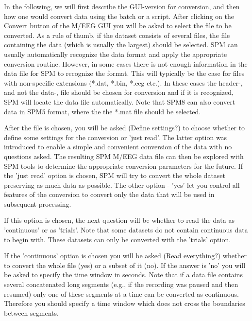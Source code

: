 In the following, we will first describe the GUI-version for
conversion, and then how one would convert data using the batch or a
script. After clicking on the Convert button of the M/EEG GUI you will
be asked to select the file to be converted. As a rule of thumb, if the
dataset consists of several files, the file containing the data (which
is usually the largest) should be selected. SPM can usually
automatically recognize the data format and apply the appropriate
conversion routine. However, in some cases there is not enough
information in the data file for SPM to recognize the format. This
will typically be the case for files with non-specific extensions
(*.dat, *.bin, *.eeg etc.). In these cases the header-, and not the
data-, file should be chosen for conversion and if it is recognized,
SPM will locate the data file automatically. Note that SPM8 can also
convert data in SPM5 format, where the the *.mat file should be
selected.

After the file is chosen, you will be asked (Define settings?) to
choose whether to define some settings for the conversion or 'just
read'.  The latter option was introduced to enable a simple and
convenient conversion of the data with no questions asked. The
resulting SPM M/EEG data file can then be explored with SPM tools to
determine the appropriate conversion parameters for the future. If
the 'just read' option is chosen, SPM will try to convert the whole
dataset preserving as much data as possible. The other option - 'yes'
let you control all features of the conversion to convert only
the data that will be used in subsequent processing.

If this option is chosen, the next question will be whether to read
the data as 'continuous' or as 'trials'. Note that some datasets do
not contain continuous data to begin with. These datasets can only be
converted with the 'trials' option.  

If the 'continuous' option is chosen you will be asked (Read
everything?) whether to convert the whole file (yes) or a subset of it
(no). If the answer is 'no' you will be asked to specify the time
window in seconds. Note that if a data file contains several
concatenated long segments (e.g., if the recording was paused
and then resumed) only one of these segments at a time can be
converted as continuous.  Therefore you should specify a time window
which does not cross the boundaries between segments.  

